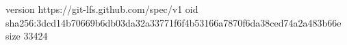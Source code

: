 version https://git-lfs.github.com/spec/v1
oid sha256:3dcd14b70669b6db03da32a33771f6f4b53166a7870f6da38ced74a2a483b66e
size 33424
